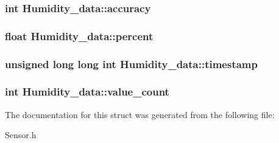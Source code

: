 \subsubsection[{accuracy}]{\setlength{\rightskip}{0pt plus 5cm}int Humidity\-\_\-data\-::accuracy}\label{structHumidity__data_ab9f57bcf33492a14b8f8152ae0711f1b}
\subsubsection[{percent}]{\setlength{\rightskip}{0pt plus 5cm}float Humidity\-\_\-data\-::percent}\label{structHumidity__data_a1ae3cb64c62f7d0c1d33c1147383a6a6}
\subsubsection[{timestamp}]{\setlength{\rightskip}{0pt plus 5cm}unsigned long long int Humidity\-\_\-data\-::timestamp}\label{structHumidity__data_a42c9802cb7bdb42118fe789b15ee5bb7}
\subsubsection[{value\-\_\-count}]{\setlength{\rightskip}{0pt plus 5cm}int Humidity\-\_\-data\-::value\-\_\-count}\label{structHumidity__data_a58b34e76f7f0a9f1d27700fd12915433}


The documentation for this struct was generated from the following file\-:\begin{DoxyCompactItemize}
\item 
Sensor.\-h\end{DoxyCompactItemize}
